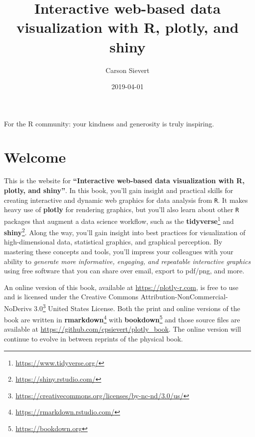 \documentclass[
  12pt,
]{krantz}
\title{Interactive web-based data visualization with R, plotly, and shiny}
\author{Carson Sievert}
\date{2019-04-01}
\renewcommand{\href}[2]{#2\footnote{\url{#1}}}
\begin{document}
\maketitle

\thispagestyle{empty}
\begin{center}
For the R community: your kindness and generosity is truly inspiring.
\end{center}

\setlength{\abovedisplayskip}{-5pt}
\setlength{\abovedisplayshortskip}{-5pt}

{
\hypersetup{linkcolor=}
\setcounter{tocdepth}{2}
\tableofcontents
}
\hypertarget{welcome}{%
\chapter*{Welcome}\label{welcome}}


This is the website for \textbf{``Interactive web-based data visualization with R, plotly, and shiny''}. In this book, you'll gain insight and practical skills for creating interactive and dynamic web graphics for data analysis from \texttt{R}. It makes heavy use of \textbf{plotly} for rendering graphics, but you'll also learn about other \texttt{R} packages that augment a data science workflow, such as the \href{https://www.tidyverse.org/}{\textbf{tidyverse}} and \href{https://shiny.rstudio.com/}{\textbf{shiny}}. Along the way, you'll gain insight into best practices for visualization of high-dimensional data, statistical graphics, and graphical perception. By mastering these concepts and tools, you'll impress your colleagues with your ability to \emph{generate more informative, engaging, and repeatable interactive graphics} using free software that you can share over email, export to pdf/png, and more.

An online version of this book, available at \url{https://plotly-r.com}, is free to use and is licensed under the \href{https://creativecommons.org/licenses/by-nc-nd/3.0/us/}{Creative Commons Attribution-NonCommercial-NoDerivs 3.0} United States License. Both the print and online versions of the book are written in \href{https://rmarkdown.rstudio.com/}{\textbf{rmarkdown}} with \href{https://bookdown.org}{\textbf{bookdown}} and those source files are available at \url{https://github.com/cpsievert/plotly_book}. The online version will continue to evolve in between reprints of the physical book.
\end{document}
